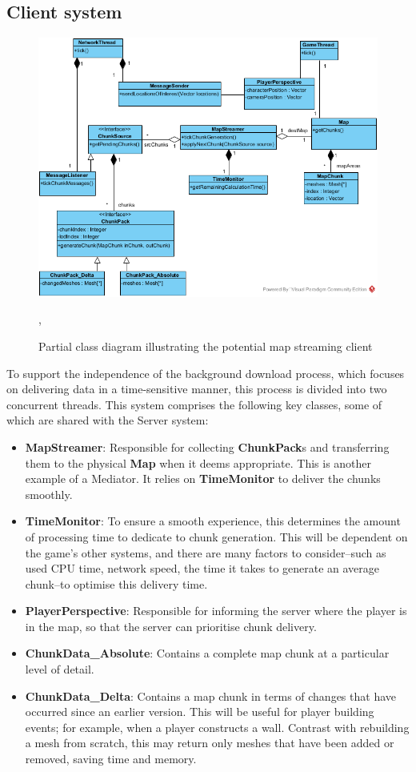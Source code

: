 \documentclass{scrartcl}
\begin{document}
\pagebreak
\subsection{Client system}
\begin{figure}[H]
	\centering
	\includegraphics[width=1.0\linewidth]{Client_Side_Streamer.png}
	\caption{Partial class diagram illustrating the potential map streaming client},
	\label{fig:clientsystem}
\end{figure}

To support the independence of the background download process, which focuses on delivering data in a time-sensitive manner, this process is divided into two concurrent threads. This system comprises the following key classes, some of which are shared with the Server system:

\begin{itemize}
\item \textbf{MapStreamer}: Responsible for collecting \textbf{ChunkPack}s and transferring them to the physical \textbf{Map} when it deems appropriate. This is another example of a Mediator. It relies on \textbf{TimeMonitor} to deliver the chunks smoothly.
\item \textbf{TimeMonitor}: To ensure a smooth experience, this determines the amount of processing time to dedicate to chunk generation. This will be dependent on the game's other systems, and there are many factors to consider--such as used CPU time, network speed, the time it takes to generate an average chunk--to optimise this delivery time.
\item \textbf{PlayerPerspective}: Responsible for informing the server where the player is in the map, so that the server can prioritise chunk delivery.
\item \textbf{ChunkData\_Absolute}: Contains a complete map chunk at a particular level of detail.
\item \textbf{ChunkData\_Delta}: Contains a map chunk in terms of changes that have occurred since an earlier version. This will be useful for player building events; for example, when a player constructs a wall. Contrast with rebuilding a mesh from scratch, this may return only meshes that have been added or removed, saving time and memory.
\end{itemize}
\end{document}
